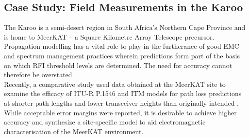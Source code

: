 \documentclass[10pt,journal,twoside]{IEEEtran}
\begin{document}
\subsection{Case Study: Field Measurements in the Karoo}
The Karoo is a semi-desert region in South Africa's Northern Cape Province and is home to MeerKAT -- a Square Kilometre Array Telescope precursor. Propagation modelling has a vital role to play in the furtherance of good EMC and spectrum management practices wherein predictions form part of the basis on which RFI threshold levels are determined. The need for accuracy cannot therefore be overstated.\\
Recently, a comparative study used data obtained at the MeerKAT site to examine the efficacy of ITU-R P.\num{1546} and ITM models for path loss predictions at shorter path lengths and lower transceiver heights than originally intended \cite{Phiri}. While acceptable error margins were reported, it is desirable to achieve higher accuracy and synthesize a site-specific model to aid electromagnetic characterisation of the MeerKAT environment.
\end{document}
